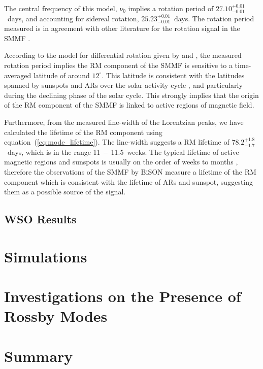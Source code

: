 The central frequency of this model, $\nu_0$ implies a rotation period of $27.10^{+0.01}_{-0.01}$~days, and accounting for sidereal rotation, $25.23^{+0.01}_{-0.01}$~days. The rotation period measured is in agreement with other literature for the rotation signal in the SMMF \citep{chaplin_studies_2003, xie_temporal_2017}. 

According to the model for differential rotation given by \citet{snodgrass_magnetic_1983} and \citet{brown_inferring_1989}, the measured rotation period implies the RM component of the SMMF is sensitive to a time-averaged latitude of around $12^{\circ}$. This latitude is consistent with the latitudes spanned by sunspots and ARs over the solar activity cycle \citep{maunder_note_1904, mcintosh_deciphering_2014, thomas_asteroseismic_2019}, and particularly during the declining phase of the solar cycle. This strongly implies that the origin of the RM component of the SMMF is linked to active regions of magnetic field.

Furthermore, from the measured line-width of the Lorentzian peaks, we have calculated the lifetime of the RM component using equation~(\ref{eq:mode_lifetime}). The line-width suggests a RM lifetime of $78.2_{-1.7}^{+1.8}$~days, which is in the range 11~--~11.5~weeks. The typical lifetime of active magnetic regions and sunspots is usually on the order of weeks to months \citep{zwaan_solar_1981, howard_sunspot_2001, hathaway_sunspot_2008}, therefore the observations of the SMMF by BiSON measure a lifetime of the RM component which is consistent with the lifetime of ARs and sunspot, suggesting them as a possible source of the signal.


\subsection{WSO Results}\label{sec:WSO_reults}



\section{Simulations}\label{sec:SMMF_artificial}



\section{Investigations on the Presence of Rossby Modes}\label{sec:SMMF_rmode}





\section{Summary}\label{sec:SMMF_summary}